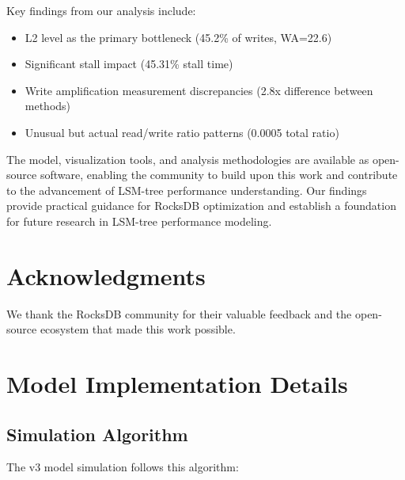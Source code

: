 \documentclass[11pt,twocolumn]{article}
\begin{document}
Key findings from our analysis include:
\begin{itemize}
    \item L2 level as the primary bottleneck (45.2\% of writes, WA=22.6)
    \item Significant stall impact (45.31\% stall time)
    \item Write amplification measurement discrepancies (2.8x difference between methods)
    \item Unusual but actual read/write ratio patterns (0.0005 total ratio)
\end{itemize}

The model, visualization tools, and analysis methodologies are available as open-source software, enabling the community to build upon this work and contribute to the advancement of LSM-tree performance understanding. Our findings provide practical guidance for RocksDB optimization and establish a foundation for future research in LSM-tree performance modeling.

\section*{Acknowledgments}

We thank the RocksDB community for their valuable feedback and the open-source ecosystem that made this work possible.




\appendix

\section{Model Implementation Details}

\subsection{Simulation Algorithm}

The v3 model simulation follows this algorithm:
\end{document}
